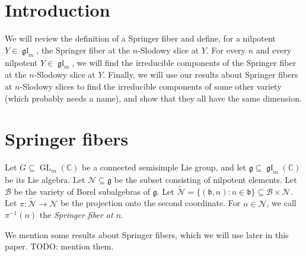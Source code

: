 \documentclass[12pt,psamsfonts]{article}
\DeclareMathOperator{\GL}{GL}
\DeclareMathOperator{\gl}{\mathfrak{gl}}
\begin{document}

\section{Introduction}
We will review the definition of a Springer fiber and define, for a nilpotent \(Y \in \gl_m\), the Springer fiber at the \(n\)-Slodowy slice at \(Y\).
For every \(n\) and every nilpotent \(Y \in \gl_m\), we will find the irreducible components of the Springer fiber at the \(n\)-Slodowy slice at \(Y\).
Finally, we will use our results about Springer fibers at \(n\)-Slodowy slices to find the irreducible components of some other variety (which probably needs a name), and show that they all have the same dimension.

\section{Springer fibers}
Let \(G \subseteq \GL_m(\mathbb{C})\) be a connected semisimple Lie group, and let \(\mathfrak{g} \subseteq \gl_m(\mathbb{C})\) be its Lie algebra.
Let \(\mathcal{N} \subseteq \mathfrak{g}\) be the subset consisting of nilpotent elements.
Let \(\mathcal{B}\) be the variety of Borel subalgebras of \(\mathfrak{g}\).
Let \(\widetilde{\mathcal{N}} = \{(\mathfrak{b}, n) : n \in \mathfrak{b}\} \subseteq \mathcal{B} \times \mathcal{N}\).
Let \(\pi : \widetilde{\mathcal{N}} \to \mathcal{N}\) be the projection onto the second coordinate.
For \(n \in \mathcal{N}\), we call \(\pi^{-1}(n)\) the \emph{Springer fiber at \(n\)}.
\par We mention some results about Springer fibers, which we will use later in this paper.
TODO: mention them.
\end{document}
